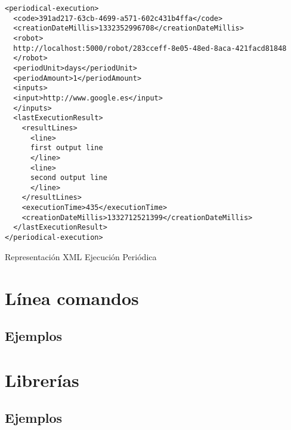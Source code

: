 \begin{table}
\begin{verbatim}
<periodical-execution>
  <code>391ad217-63cb-4699-a571-602c431b4ffa</code>
  <creationDateMillis>1332352996708</creationDateMillis>
  <robot>
  http://localhost:5000/robot/283cceff-8e05-48ed-8aca-421facd81848
  </robot>
  <periodUnit>days</periodUnit>
  <periodAmount>1</periodAmount>
  <inputs>
  <input>http://www.google.es</input>
  </inputs>
  <lastExecutionResult>
    <resultLines>
      <line>
      first output line
      </line>
      <line>
      second output line
      </line>
    </resultLines>
    <executionTime>435</executionTime>
    <creationDateMillis>1332712521399</creationDateMillis>
  </lastExecutionResult>
</periodical-execution>
\end{verbatim}
\caption{Representación XML Ejecución Periódica}
\label{periodical_execution_xml_representation}
\end{table}

\newpage

\section{Línea comandos}
\subsection{Ejemplos}
\section{Librerías}
\subsection{Ejemplos}
